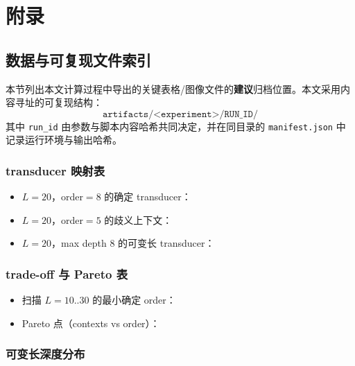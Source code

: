 
\section{附录}

\subsection{数据与可复现文件索引}

本节列出本文计算过程中导出的关键表格/图像文件的\textbf{建议}归档位置。本文采用内容寻址的可复现结构：
$$
\texttt{artifacts/<experiment>/RUN\_ID/}
$$
其中 \texttt{run\_id} 由参数与脚本内容哈希共同决定，并在同目录的 \texttt{manifest.json} 中记录运行环境与输出哈希。

\subsubsection{transducer 映射表}

\begin{sloppypar}
\begin{itemize}
\item $L=20$，order$=8$ 的确定 transducer：
\item $L=20$，order$=5$ 的歧义上下文：
\item $L=20$，max depth $8$ 的可变长 transducer：
\end{itemize}
\end{sloppypar}

\subsubsection{trade-off 与 Pareto 表}

\begin{sloppypar}
\begin{itemize}
\item 扫描 $L=10..30$ 的最小确定 order：
\item Pareto 点（contexts vs order）：
\end{itemize}
\end{sloppypar}

\subsubsection{可变长深度分布}

